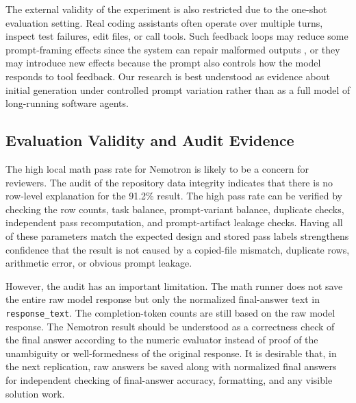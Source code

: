 The external validity of the experiment is also restricted due to the one-shot evaluation setting. Real coding assistants often operate over multiple turns, inspect test failures, edit files, or call tools. Such feedback loops may reduce some prompt-framing effects since the system can repair malformed outputs \cite{chen2022codet, madaan2023selfrefine}, or they may introduce new effects because the prompt also controls how the model responds to tool feedback. Our research is best understood as evidence about initial generation under controlled prompt variation rather than as a full model of long-running software agents.

\subsection{Evaluation Validity and Audit Evidence}

The high local math pass rate for Nemotron is likely to be a concern for reviewers. The audit of the repository data integrity indicates that there is no row-level explanation for the 91.2\% result. The high pass rate can be verified by checking the row counts, task balance, prompt-variant balance, duplicate checks, independent pass recomputation, and prompt-artifact leakage checks. Having all of these parameters match the expected design and stored pass labels strengthens confidence that the result is not caused by a copied-file mismatch, duplicate rows, arithmetic error, or obvious prompt leakage.

However, the audit has an important limitation. The math runner does not save the entire raw model response but only the normalized final-answer text in \texttt{response\_text}. The completion-token counts are still based on the raw model response. The Nemotron result should be understood as a correctness check of the final answer according to the numeric evaluator instead of proof of the unambiguity or well-formedness of the original response. It is desirable that, in the next replication, raw answers be saved along with normalized final answers for independent checking of final-answer accuracy, formatting, and any visible solution work.
